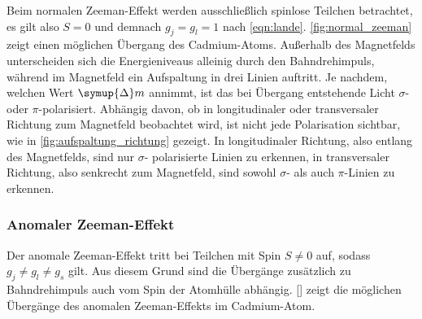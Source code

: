     Beim normalen Zeeman-Effekt werden ausschließlich spinlose Teilchen betrachtet,
    es gilt also $S = 0$ und demnach $g_j = g_l = 1$ nach \autoref{eqn:lande}.
    \autoref{fig:normal_zeeman} zeigt einen möglichen Übergang des Cadmium-Atoms.
    Außerhalb des Magnetfelds unterscheiden sich die Energieniveaus alleinig durch den Bahndrehimpuls,
    während im Magnetfeld ein Aufspaltung in drei Linien auftritt.
    Je nachdem,
    welchen Wert $\symup{\Delta} m$ annimmt,
    ist das bei Übergang entstehende Licht $\sigma$- oder $\pi$-polarisiert.
    Abhängig davon,
    ob in longitudinaler oder transversaler Richtung zum Magnetfeld beobachtet wird,
    ist nicht jede Polarisation sichtbar,
    wie in \autoref{fig:aufspaltung_richtung} gezeigt.
    In longitudinaler Richtung,
    also entlang des Magnetfelds,
    sind nur $\sigma$- polarisierte Linien zu erkennen,
    in transversaler Richtung,
    also senkrecht zum Magnetfeld,
    sind sowohl $\sigma$- als auch $\pi$-Linien zu erkennen.


\subsubsection{Anomaler Zeeman-Effekt}

    Der anomale Zeeman-Effekt tritt bei Teilchen mit Spin $S \neq 0$ auf,
    sodass $g_j \neq g_l \neq g_s$ gilt.
    Aus diesem Grund sind die Übergänge zusätzlich zu Bahndrehimpuls auch vom Spin der Atomhülle abhängig.
    \autoref{} zeigt die möglichen Übergänge des anomalen Zeeman-Effekts im Cadmium-Atom.


